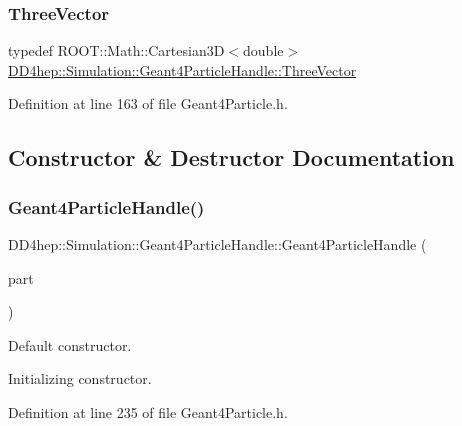 \subsubsection{\texorpdfstring{Three\+Vector}{ThreeVector}}
{\footnotesize\ttfamily typedef R\+O\+O\+T\+::\+Math\+::\+Cartesian3D$<$double$>$ \hyperlink{class_d_d4hep_1_1_simulation_1_1_geant4_particle_handle_a8aabe9ad3397b25aae653c42ec82021a}{D\+D4hep\+::\+Simulation\+::\+Geant4\+Particle\+Handle\+::\+Three\+Vector}}



Definition at line 163 of file Geant4\+Particle.\+h.



\subsection{Constructor \& Destructor Documentation}
\hypertarget{class_d_d4hep_1_1_simulation_1_1_geant4_particle_handle_aae0f6cff704f2f70a13941b9d9d2b590}{}\label{class_d_d4hep_1_1_simulation_1_1_geant4_particle_handle_aae0f6cff704f2f70a13941b9d9d2b590} 
\subsubsection{\texorpdfstring{Geant4\+Particle\+Handle()}{Geant4ParticleHandle()}\hspace{0.1cm}{\footnotesize\ttfamily [1/2]}}
{\footnotesize\ttfamily D\+D4hep\+::\+Simulation\+::\+Geant4\+Particle\+Handle\+::\+Geant4\+Particle\+Handle (\begin{DoxyParamCaption}\item[{\hyperlink{class_d_d4hep_1_1_simulation_1_1_geant4_particle}{Geant4\+Particle} $\ast$}]{part }\end{DoxyParamCaption})\hspace{0.3cm}{\ttfamily [inline]}}



Default constructor. 

Initializing constructor. 

Definition at line 235 of file Geant4\+Particle.\+h.

\hypertarget{class_d_d4hep_1_1_simulation_1_1_geant4_particle_handle_a8e62699ff44968d5f8b9926a5512450f}{}\label{class_d_d4hep_1_1_simulation_1_1_geant4_particle_handle_a8e62699ff44968d5f8b9926a5512450f} 
